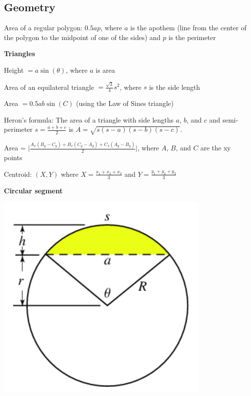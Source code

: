 
\subsection*{Geometry}

Area of a regular polygon: $0.5ap$, where $a$ is the apothem (line from the center of the polygon to the midpoint of one of the sides) and $p$ is the perimeter

\textbf{Triangles}

Height $= a \sin(\theta)$, where $a$ is area

Area of an equilateral triangle $= \frac{\sqrt{3}}{4} s^2$, where $s$ is the side length

Area $= 0.5ab \sin(C)$ (using the Law of Sines triangle)

Heron's formula: The area of a triangle with side lengths $a$, $b$, and $c$ and semi-perimeter $s = \frac{a+b+c}{2}$ is $A = \sqrt{s (s-a) (s-b) (s-c)}$.

Area = $\displaystyle \Bigg\lvert \frac{A_x (B_y - C_y) + B_x (C_y - A_y) + C_x (A_y - B_y)}{2} \Bigg\rvert$, where $A$, $B$, and $C$ are the xy points

Centroid: $(X, Y)$ where $\displaystyle X = \frac{x_1 + x_2 + x_3}{3}$ and $\displaystyle Y = \frac{y_1 + y_2 + y_3}{3}$

\textbf{Circular segment}

\begin{center}
    \includegraphics[scale=0.5]{math/img/circ_seg.png}
\end{center}

